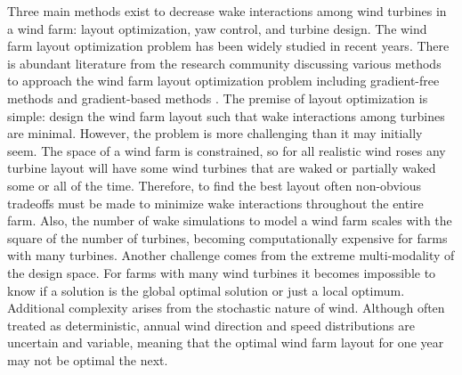 \documentclass[wes, manuscript]{copernicus}
\begin{document}
Three main methods exist to decrease wake interactions among wind turbines in a wind farm: layout optimization, yaw control, and turbine design. The wind farm layout optimization problem has been widely studied in recent years. There is abundant literature from the research community discussing various methods to approach the wind farm layout optimization problem including gradient-free methods \citep{marmidis2008optimal,emami2010new,kusiak2010design,ituarte2011optimization,feng2015solving,gao2015wind} and gradient-based methods \citep{perez2013offshore,park2015layout,guirguis2016toward,gebraad2017maximization,Fleming2016}. The premise of layout optimization is simple: design the wind farm layout such that wake interactions among turbines are minimal.
However, the problem is more challenging than it may initially seem. 
The space of a wind farm is constrained, so for all realistic wind roses any turbine layout will have some wind turbines that are waked or partially waked some or all of the time. Therefore, to find the best layout often non-obvious tradeoffs must be made to minimize wake interactions throughout the entire farm.
Also, the number of wake simulations to model a wind farm scales with the square of the number of turbines, becoming computationally expensive for farms with many turbines. Another challenge comes from the extreme multi-modality of the design space. For farms with many wind turbines it becomes impossible to know if a solution is the global optimal solution or just a local optimum.  Additional complexity arises from the stochastic nature of wind. Although often treated as deterministic, annual wind direction and speed distributions are uncertain and variable, meaning that the optimal wind farm layout for one year may not be optimal the next.
\end{document}
